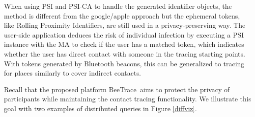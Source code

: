 \documentclass[11pt,dvipdfmx]{article}  %
\newcommand{\sysname}{\textsf{BeeTrace}\xspace}
\begin{document}
When using PSI and PSI-CA to handle the generated identifier objects, the method is different from the google/apple approach but the ephemeral tokens, like Rolling Proximity Identifiers, are still used in a privacy-preserving way. The user-side application deduces the risk of individual infection by executing a PSI instance with the MA to check if the user has a matched token, which indicates whether the user has direct contact with someone in the tracing starting points. With tokens generated by Bluetooth beacons, this can be generalized to tracing for places similarly to cover indirect contacts.

Recall that the proposed platform \sysname\ aims to protect the privacy of participants while maintaining the contact tracing functionality. 
We illustrate this goal with two examples of distributed queries in Figure \ref{diffviz}.
\end{document}
